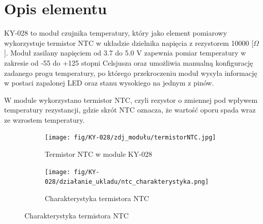 \documentclass[11pt, a4paper]{article}
\author{Dawid Sobczak}
\begin{document}
%
%
\newpage

\section*{Opis elementu}
KY-028 to moduł czujnika temperatury, który jako element pomiarowy wykorzystuje termistor NTC w układzie dzielnika napięcia z rezystorem 10000 [$\Omega$]. Moduł zasilany napięciem od 3.7 do 5.0 V zapewnia pomiar temperatury w  zakresie od -55 do +125 stopni Celsjusza oraz umożliwia manualną konfigurację zadanego progu temperatury, po którego przekroczeniu moduł wysyła informację w postaci zapalonej LED oraz stanu wysokiego na jednym z pinów.

\vspace{0.5cm}
W module wykorzystano termistor NTC, czyli rezystor o zmiennej pod wpływem temperatury rezystancji, gdzie skrót NTC oznacza, że wartość oporu spada wraz ze wzrostem temperatury. 
\vspace{0.25cm}
\begin{figure}[h]
\centering
\begin{subfigure}{.5\textwidth}
\centering
\texttt{[image: fig/KY-028/zdj\_modułu/termistorNTC.jpg]}
\caption{Termistor NTC w module KY-028}
\label{fig:_zdjecie_elementu}
\end{subfigure}%
\begin{subfigure}{.5\textwidth}
\centering
\texttt{[image: fig/KY-028/działanie\_ukladu/ntc\_charakterystyka.png]}
\caption{Charakterystyka termistora NTC}
\label{fig:_zasada_dzialania_elementu}
\end{subfigure}
\label{fig:element}
\end{figure}
\vspace{0.25cm}
\vspace{0.75cm}
\end{document}
